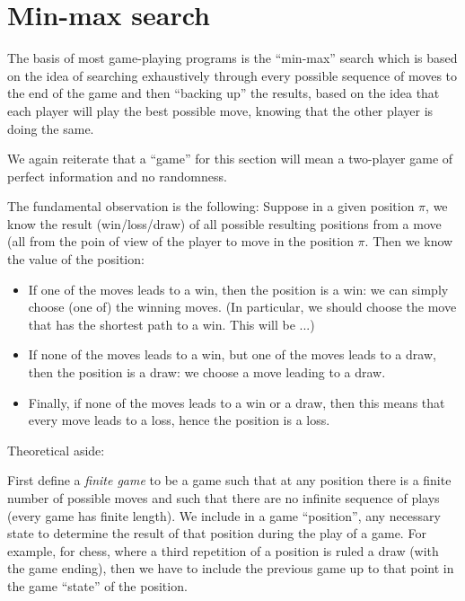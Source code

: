 \documentclass[10pt,dvipdfmx]{report}
\begin{document}
\section{Min-max search}

The basis of most game-playing programs is the
``min-max'' search which is based on the idea of
searching exhaustively through every possible sequence
of moves to the end of the game and then ``backing up''
the results, based on the idea that each player will play
the best possible move, knowing that the other player is doing
the same.

We again reiterate that a ``game'' for this section will mean
a two-player game of perfect information and no randomness.

The fundamental observation is the following:
Suppose in a given position $\pi$, we know the result (win/loss/draw)
of all possible resulting positions from a move (all from the poin of view
of the player to move in the position $\pi$.  Then we know the value of the position:
\begin{itemize}
\item If one of the moves leads to a win, then the position is a win:
    we can simply choose (one of) the winning moves.  (In particular, we should
    choose the move that has the shortest path to a win.  This will be ...)
\item If none of the moves leads to a win, but one of the moves leads to a draw,
    then the position is a draw: we choose a move leading to a draw.
\item Finally, if none of the moves leads to a win or a draw,
    then this means that every move leads to a loss, hence the position is a loss.
\end{itemize}

Theoretical aside:

First define a {\em finite game} to be a game
such that at any position there is a finite number of possible
moves and such that there are no infinite sequence of plays (every game
has finite length).  We include in a game ``position'', any necessary
state to determine the result of that position during the play of a game.
For example, for chess, where a third repetition of a position is ruled a draw
(with the game ending), then we have to include the previous game up to that point
in the game ``state'' of the position.
\end{document}

